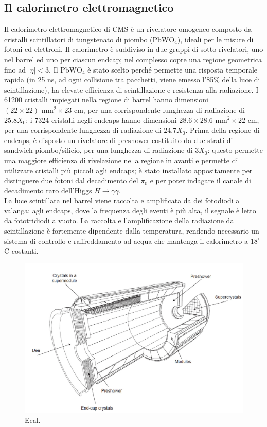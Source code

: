 \subsection{Il calorimetro elettromagnetico}
Il calorimetro elettromagnetico di CMS \`e un rivelatore omogeneo composto da cristalli scintillatori di tungstenato di piombo ($\mbox{PbWO}_4$), ideali per le misure di fotoni ed elettroni. Il calorimetro \`e suddiviso in due gruppi di sotto-rivelatori, uno nel barrel ed uno per ciascun endcap; nel complesso copre una regione geometrica fino ad $|\eta|<3$. Il $\mbox{PbWO}_4$ \`e stato scelto perch\'e permette una risposta temporale rapida (in 25 ns, ad ogni collisione tra pacchetti, viene emesso l'85\% della luce di scintillazione), ha elevate efficienza di scintillazione e resistenza alla radiazione. I 61200 cristalli impiegati nella regione di barrel hanno dimensioni $(22 \times 22) \mbox{ mm}^2 \times 23 \mbox{ cm}$, per una corrispondente lunghezza di radiazione di $25.8 X_0$; i 7324 cristalli negli endcaps hanno dimensioni $ 28.6 \times 28.6 \mbox{ mm}^2 \times 22 \mbox{ cm}$, per una corrispondente lunghezza di radiazione di $24.7 X_0$. Prima della regione di endcaps, \`e disposto un rivelatore di preshower costituito da due strati di sandwich piombo/silicio, per una lunghezza di radiazione di $3X_0$: questo permette una maggiore efficienza di rivelazione nella regione in avanti e permette di utilizzare cristalli pi\`u piccoli agli endcaps; \`e stato installato appositamente per distinguere due fotoni dal decadimento del $\pi_0$ e per poter indagare il canale di decadimento raro dell'Higgs $H \rightarrow \gamma \gamma$.\\
La luce scintillata nel barrel viene raccolta e amplificata da dei fotodiodi a valanga; agli endcaps, dove la frequenza degli eventi \`e pi\`u alta, il segnale \`e letto da fototridiodi a vuoto. La raccolta e l'amplificazione della radiazione da scintillazione \`e fortemente dipendente dalla temperatura, rendendo necessario un sistema di controllo e raffreddamento ad acqua che mantenga il calorimetro a $18^{\circ}$ C costanti.

\begin{figure}[!htb]
  \centering
    \includegraphics[width=.7\textwidth]{figures/cmsecal.png}
  \caption{Ecal.}
  \label{fig:CMS_ecal}
\end{figure}

